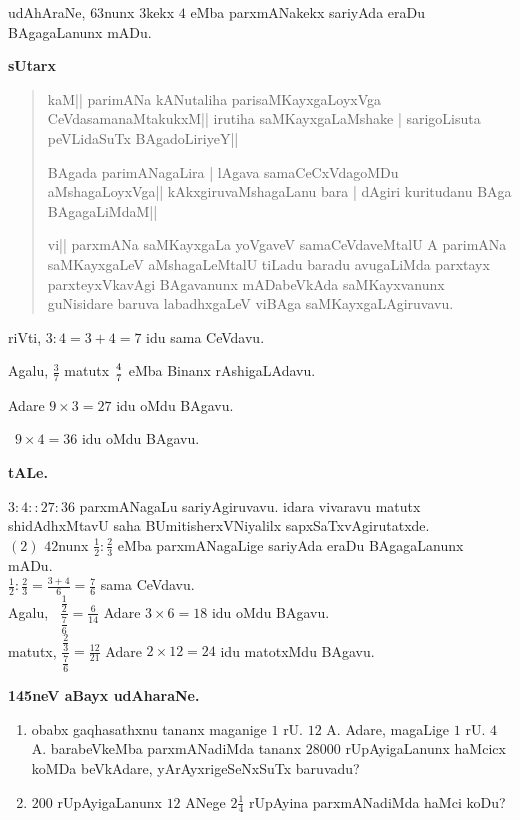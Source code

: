 udAhAraNe, $63$nunx $3$kekx $4$ eMba parxmANakekx sariyAda eraDu BAgagaLanunx mADu.

\begin{center}
{\bf\large sUtarx}
\end{center}

\begin{verse}
kaM|| parimANa kANutaliha parisaMKayxgaLoyxVga CeVdasamanaMtakukxM|| irutiha saMKayxgaLaMshake | sarigoLisuta peVLidaSuTx BAgadoLiriyeY||

BAgada parimANagaLira | lAgava samaCeCxVdagoMDu aMshagaLoyxVga|| kAkxgiruvaMshagaLanu bara | dAgiri kuritudanu BAga BAgagaLiMdaM||

vi|| parxmANa saMKayxgaLa yoVgaveV samaCeVdaveMtalU A parimANa saMKayxgaLeV aMshagaLeMtalU tiLadu baradu avugaLiMda parxtayx parxteyxVkavAgi BAgavanunx mADabeVkAda saMKayxvanunx guNisidare baruva labadhxgaLeV viBAga saMKayxgaLAgiruvavu.
\end{verse}

riVti, $3 : 4 = 3 + 4 = 7$ idu sama CeVdavu.
 
\qq\qq Agalu, $\tfrac{3}{7}$ matutx ${4}\above 0pt {7}$ eMba Binanx rAshigaLAdavu.

\qq Adare $9 \times 3 = 27$ idu oMdu BAgavu.
 
\qq\qquad\, $9 \times 4 = 36$ idu oMdu BAgavu.

\begin{center}
{\bf tALe.}
\end{center}

\qq $3 : 4 :: 27 : 36$ parxmANagaLu sariyAgiruvavu. idara vivaravu matutx shidAdhxMtavU saha BUmiti\-sherxVNiyalilx sapxSaTxvAgirutatxde.\\

$(2)$ $42$nunx $\tfrac{1}{2}:\tfrac{2}{3}$ eMba parxmANagaLige sariyAda eraDu BAgagaLanunx mADu.\\

\qq\quad\; $\tfrac{1}{2}:\tfrac{2}{3}=\tfrac{3+4}{6}=\tfrac{7}{6}$ sama CeVdavu.\\

Agalu,\quad~ $\dfrac{\tfrac{1}{2}}{\tfrac{7}{6}}=\tfrac{6}{14}$ Adare $3\times6=18$ idu oMdu BAgavu.\\

matutx, \quad $\dfrac{\tfrac{2}{3}}{\tfrac{7}{6}}=\tfrac{12}{21}$ Adare $2\times 12=24$ idu matotxMdu BAgavu.

\begin{center}
{\bf\large 145neV aBayx udAharaNe.}
\end{center}

\begin{enumerate}[\rm(1)]
\item obabx gaqhasathxnu tananx maganige $1$ rU. $12$ A. Adare, magaLige $1$ rU. $4$ A. barabeVkeMba parxmANadiMda tananx $28000$ rUpAyigaLanunx haMcicx koMDa beVkAdare, yArAyxrigeSeNxSuTx baruvadu?

\item $200$ rUpAyigaLanunx $12$ ANege $2\tfrac{1}{4}$ rUpAyina parxmANadiMda haMci koDu?
\end{enumerate}
